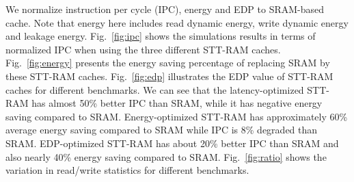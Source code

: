 We normalize instruction per cycle (IPC), energy and EDP to SRAM-based cache. Note that energy here includes read dynamic energy, write dynamic energy and leakage energy. Fig.~\ref{fig:ipc} shows the simulations results in terms of normalized IPC when using the three different STT-RAM caches. Fig.~\ref{fig:energy} presents the energy saving percentage of replacing SRAM by these STT-RAM caches. Fig.~\ref{fig:edp} illustrates the EDP value of STT-RAM caches for different benchmarks. We can see that the latency-optimized STT-RAM has almost 50\% better IPC than SRAM, while it has negative energy saving compared to SRAM. Energy-optimized STT-RAM has approximately 60\% average energy saving compared to SRAM while IPC is 8\% degraded than SRAM. EDP-optimized STT-RAM has about 20\% better IPC than SRAM and also nearly 40\% energy saving compared to SRAM. Fig.~\ref{fig:ratio} shows the variation in read/write statistics for different benchmarks. 